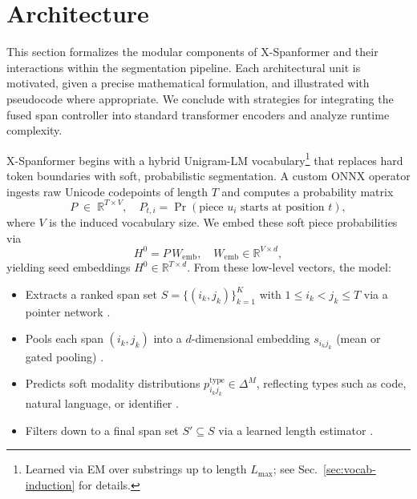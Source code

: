 \section{Architecture}
\label{sec:architecture}

This section formalizes the modular components of X-Spanformer and their interactions within the segmentation pipeline.  Each architectural unit is motivated, given a precise mathematical formulation, and illustrated with pseudocode where appropriate.  We conclude with strategies for integrating the fused span controller into standard transformer encoders and analyze runtime complexity.

X-Spanformer begins with a hybrid Unigram-LM vocabulary\footnote{Learned via EM over substrings up to length \(L_{\max}\); see Sec.~\ref{sec:vocab-induction} for details.} that replaces hard token boundaries with soft, probabilistic segmentation.  A custom ONNX operator ingests raw Unicode codepoints of length \(T\) and computes a probability matrix  
\begin{equation}
P \;\in\;\mathbb{R}^{T\times V}, 
\quad
P_{t,i} = \Pr(\text{piece }u_i\text{ starts at position }t),
\label{eq:prob_matrix}
\end{equation}
where \(V\) is the induced vocabulary size.  We embed these soft piece probabilities via  
\begin{equation}
H^0 = P\,W_{\mathrm{emb}},
\quad
W_{\mathrm{emb}}\in\mathbb{R}^{V\times d},
\label{eq:seed_embeddings}
\end{equation}
yielding seed embeddings \(H^0\in\mathbb{R}^{T\times d}\).  From these low-level vectors, the model:

\begin{itemize}
	\item Extracts a ranked span set \(S=\{(i_k,j_k)\}_{k=1}^K\) with \(1\le i_k<j_k\le T\) via a pointer network \cite{vinyals2015pointer}.
	\item Pools each span \((i_k,j_k)\) into a \(d\)-dimensional embedding \(s_{i_kj_k}\) (mean or gated pooling) \cite{tay2021charformer}.
	\item Predicts soft modality distributions \(p^\mathrm{type}_{i_kj_k}\in\Delta^M\), reflecting types such as code, natural language, or identifier \cite{lin2021codemix,li2021prefix}.
	\item Filters down to a final span set \(S'\subseteq S\) via a learned length estimator \cite{cheng2021masked}.
\end{itemize}

